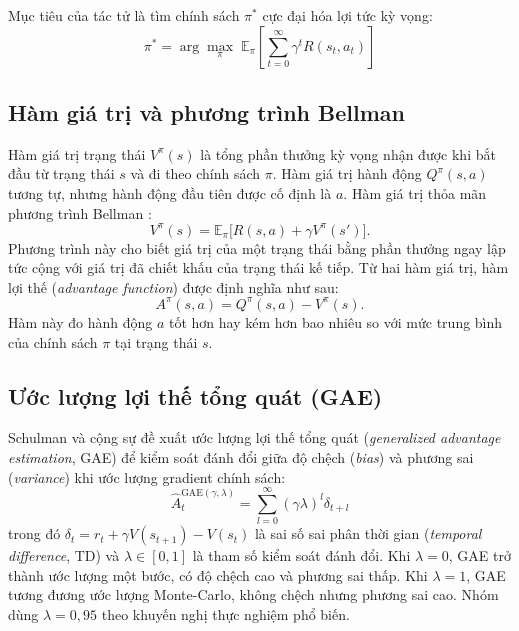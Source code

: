 Mục tiêu của tác tử là tìm chính sách $\pi^*$ cực đại hóa lợi tức kỳ vọng:
\begin{equation}
    \pi^* = \arg\max_\pi \; \mathbb{E}_\pi \left[ \sum_{t=0}^{\infty}
    \gamma^t R(s_t, a_t) \right]
    \label{eq:objectiveRL}
\end{equation}

\subsection{Hàm giá trị và phương trình Bellman}
\label{subsec:hamGiaTri}

Hàm giá trị trạng thái $V^\pi(s)$ là tổng phần thưởng kỳ vọng nhận được khi bắt đầu từ trạng thái $s$ và đi theo chính sách $\pi$. Hàm giá trị hành động $Q^\pi(s, a)$ tương tự, nhưng hành động đầu tiên được cố định là $a$. Hàm giá trị thỏa mãn phương trình Bellman \parencite{sutton2018}:
\begin{equation}
    V^\pi(s) = \mathbb{E}_\pi \bigl[ R(s, a) + \gamma V^\pi(s') \bigr].
    \label{eq:bellman}
\end{equation}
Phương trình này cho biết giá trị của một trạng thái bằng phần thưởng ngay lập tức cộng với giá trị đã chiết khấu của trạng thái kế tiếp. Từ hai hàm giá trị, hàm lợi thế (\textit{advantage function}) được định nghĩa như sau:
\begin{equation}
    A^\pi(s, a) = Q^\pi(s, a) - V^\pi(s).
    \label{eq:advantage}
\end{equation}
Hàm này đo hành động $a$ tốt hơn hay kém hơn bao nhiêu so với mức trung bình của chính sách $\pi$ tại trạng thái $s$.

\subsection{Ước lượng lợi thế tổng quát (GAE)}
\label{subsec:gae}

Schulman và cộng sự \cite{schulman2016gae} đề xuất ước lượng lợi thế tổng quát (\textit{generalized advantage estimation}, GAE) để kiểm soát đánh đổi giữa độ chệch (\textit{bias}) và phương sai (\textit{variance}) khi ước lượng gradient chính sách:
\begin{equation}
    \hat{A}_t^{\text{GAE}(\gamma, \lambda)} = \sum_{l=0}^{\infty}
    (\gamma \lambda)^l \delta_{t+l}
    \label{eq:gae}
\end{equation}
trong đó $\delta_t = r_t + \gamma V(s_{t+1}) - V(s_t)$ là sai số sai phân thời gian (\textit{temporal difference}, TD) và $\lambda \in [0, 1]$ là tham số kiểm soát đánh đổi. Khi $\lambda = 0$, GAE trở thành ước lượng một bước, có độ chệch cao và phương sai thấp. Khi $\lambda = 1$, GAE tương đương ước lượng Monte-Carlo, không chệch nhưng phương sai cao. Nhóm dùng $\lambda = 0{,}95$ theo khuyến nghị thực nghiệm phổ biến.

